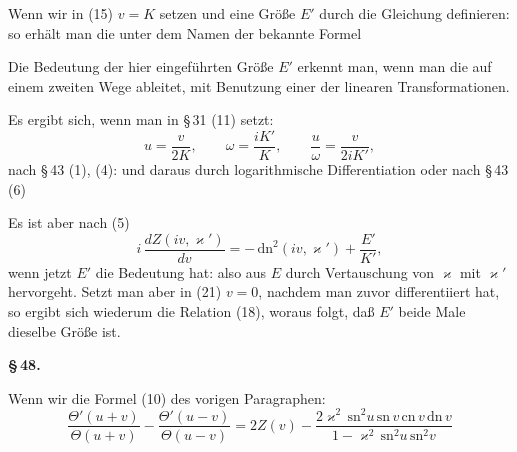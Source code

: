 
Wenn wir in (15) $v=K$ setzen und eine Größe $E'$ durch
die Gleichung definieren:
so erhält man die unter dem Namen der  bekannte Formel

Die Bedeutung der hier eingeführten Größe $E'$ erkennt man,
wenn man die  auf einem zweiten Wege
ableitet, mit Benutzung einer der linearen Transformationen.

Es ergibt sich, wenn man in \S\,31 (11) setzt:
\[
u = \frac{v}{2K}, \qquad \omega = \frac{iK'}{K}, \qquad \frac{u}{\omega} = \frac{v}{2iK'},
\]
nach \S\,43 (1), (4):
und daraus durch logarithmische Differentiation
oder nach \S\,43 (6)

Es ist aber nach (5)
\[
i\,\frac{dZ(iv,\varkappa')}{dv} = -\,\mathrm{dn}^2(iv,\varkappa') + \frac{E'}{K'},
\]
wenn jetzt $E'$ die Bedeutung hat:
also aus $E$ durch Vertauschung von $\varkappa$ mit $\varkappa'$ hervorgeht. Setzt man aber
in (21) $v=0$, nachdem man zuvor differentiiert hat, so ergibt
sich wiederum die Relation (18), woraus folgt, daß $E'$ beide
Male dieselbe Größe ist.

\begin{center}
\textbf{\S\,48. }
\end{center}

Wenn wir die Formel (10) des vorigen Paragraphen:
\[
\frac{\Theta'(u+v)}{\Theta(u+v)} - \frac{\Theta'(u-v)}{\Theta(u-v)} = 2Z(v) - \frac{2\varkappa^2\,\mathrm{sn}^2 u\,\mathrm{sn}\,v\,\mathrm{cn}\,v\,\mathrm{dn}\,v}{1 - \varkappa^2\,\mathrm{sn}^2 u\,\mathrm{sn}^2 v}
\]
